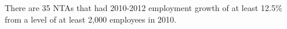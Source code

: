 There are 35 NTAs that had 2010-2012 employment growth of at least 12.5\% from a level of at least 2,000 employees in 2010.